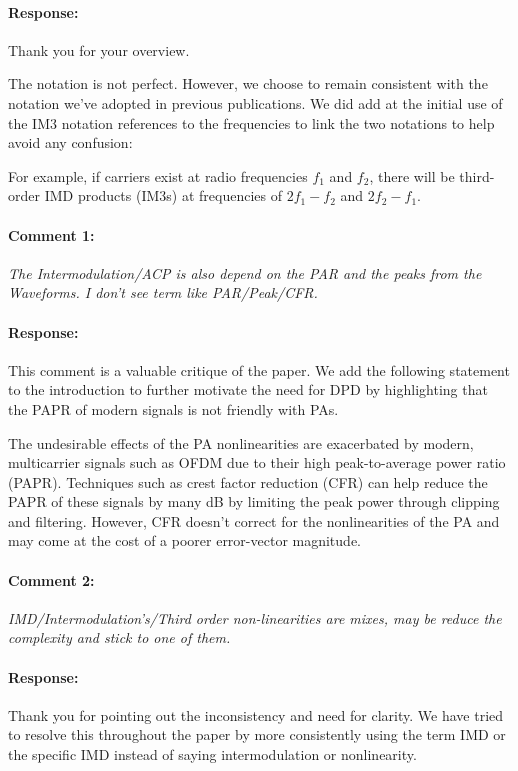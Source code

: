 \documentclass[]{article}
\begin{document}
\paragraph{Response:}
Thank you for your overview. 

The notation is not perfect. However, we choose to remain consistent with the notation we've adopted in previous publications. We did add at the initial use of the IM3 notation references to the frequencies to link the two notations to help avoid any confusion:

{\color{red} For example, if carriers exist at radio frequencies $f_1$ and $f_2$, there will be third-order IMD products (IM3s) at frequencies of $2f_1 - f_2$ and $2f_2 - f_1$.}



\paragraph{Comment 1:}\textit{The Intermodulation/ACP is also depend on the PAR and the peaks from the Waveforms. I don't see term like PAR/Peak/CFR.}

\paragraph{Response:}
This comment is a valuable critique of the paper. We add the following statement to the introduction to further motivate the need for DPD by highlighting that the PAPR of modern signals is not friendly with PAs. 
 
{\color{red} The undesirable effects of the PA nonlinearities are exacerbated by modern, multicarrier signals such as OFDM due to their high peak-to-average power ratio (PAPR). Techniques such as crest factor reduction (CFR) can help reduce the PAPR of these signals by many dB by limiting the peak power through clipping and filtering. However, CFR doesn't correct for the nonlinearities of the PA and may come at the cost of a poorer error-vector magnitude.} 

\paragraph{Comment 2:}\textit{IMD/Intermodulation's/Third order non-linearities are mixes, may be reduce the complexity and stick to one of them.}
\paragraph{Response:}
Thank you for pointing out the inconsistency and need for clarity. We have tried to resolve this throughout the paper by more consistently using the term IMD or the specific IMD instead of saying intermodulation or nonlinearity. 
\end{document}
